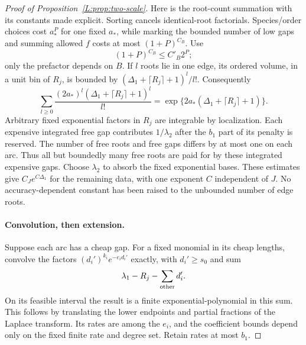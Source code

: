 \documentclass[11pt]{article}
\numberwithin{equation}{section}
\theoremstyle{definition}\newtheorem{definition}[theorem]{Definition}
\theoremstyle{remark}\newtheorem{remark}[theorem]{Remark}
\begin{document}
\begin{proof}[Proof of Proposition~\ref{L:prop:two-scale}]
Here is the root-count summation with its constants made explicit.
Sorting cancels identical-root factorials. Species/order choices cost
$a_*^P$ for one fixed $a_*$, while marking the bounded number of low gaps
and summing allowed $f$ costs at most $(1+P)^{C_B}$. Use
\[
       (1+P)^{C_B}\le C'_B2^P;
\]
only the prefactor depends on $B$. If $l$ roots lie in one edge,
its ordered volume, in a unit bin of $R_j$, is bounded by
$(\Delta_1+\lceil R_j\rceil+1)^l/l!$. Consequently
\[
 \sum_{l\ge0}\frac{(2a_*)^l(\Delta_1+\lceil R_j\rceil+1)^l}{l!}
 =\exp\{2a_*(\Delta_1+\lceil R_j\rceil+1)\}.
\]
Arbitrary fixed exponential factors in $R_j$ are integrable by
localization. Each expensive integrated free gap contributes
$1/\lambda_2$ after the $b_1$ part of its penalty is reserved.
The number of free roots and free gaps differs by at most one on each
arc. Thus all but boundedly many free roots are paid for by these
integrated expensive gaps. Choose $\lambda_2$
to absorb the fixed exponential bases. These estimates give
$C_J e^{C\Delta_1}$ for the remaining data, with one exponent $C$
independent of $J$. No accuracy-dependent constant has been raised
to the unbounded number of edge roots.

\paragraph{Convolution, then extension.}
Suppose each arc has a cheap gap. For a fixed monomial in its cheap
lengths, convolve the factors $(d_i')^{k_i}e^{-e_i d_i'}$ exactly,
with $d_i'\ge s_0$ and sum
\[
            \lambda_1-R_j-\sum_{\rm other}d_i'.
\]
On its feasible interval the result is a finite exponential-polynomial
in this sum. This follows by translating the lower endpoints and
partial fractions of the Laplace transform. Its rates are among the
$e_i$, and the coefficient bounds depend only on the fixed finite rate
and degree set. Retain rates at most $b_1$.


\end{proof}
\end{document}
